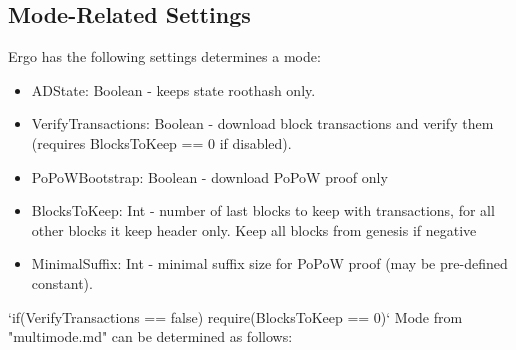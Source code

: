 \documentclass[]{article}   %
\begin{document}
\subsection{Mode-Related Settings}
Ergo has the following settings determines a mode:
\begin{itemize}
\item ADState: Boolean - keeps state roothash only.
\item VerifyTransactions: Boolean - download block transactions and verify them (requires BlocksToKeep == 0 if disabled).
\item PoPoWBootstrap: Boolean - download PoPoW proof only
\item BlocksToKeep: Int - number of last blocks to keep with transactions, for all other blocks it keep header
only. Keep all blocks from genesis if negative
\item MinimalSuffix: Int - minimal suffix size for PoPoW proof (may be pre-defined constant).
\end{itemize}
\par
‘if(VerifyTransactions == false) require(BlocksToKeep == 0)‘ Mode from "multimode.md" can be determined as follows:


\end{document}
